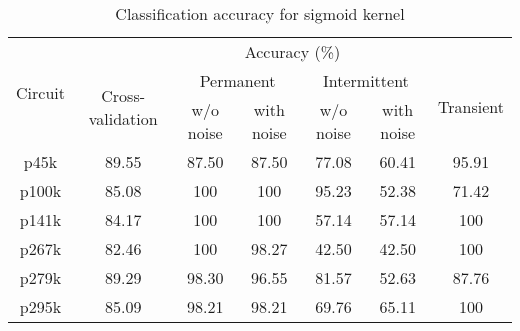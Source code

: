 \begin{table}[h]

	\captionsetup{justification=centering}
\begin{tabular}{ccccccc}
\hline
\multirow{3}{*}{Circuit} & \multicolumn{6}{c}{Accuracy (\%)}                                                                                                 \\ \cline{2-7} 
                         & \multirow{2}{*}{Cross-validation} & \multicolumn{2}{c}{Permanent} & \multicolumn{2}{c}{Intermittent} & \multirow{2}{*}{Transient} \\ \cline{3-6}
                         &                                   & w/o noise     & with noise    & w/o noise      & with noise      &                            \\ \hline
p45k                     & 89.55                             & 87.50         & 87.50         & 77.08          & 60.41           & 95.91                      \\
p100k                    & 85.08                             & 100           & 100           & 95.23          & 52.38           & 71.42                      \\
p141k                    & 84.17                             & 100           & 100           & 57.14          & 57.14           & 100                        \\
p267k                    & 82.46                             & 100           & 98.27         & 42.50          & 42.50           & 100                        \\
p279k                    & 89.29                             & 98.30         & 96.55         & 81.57          & 52.63           & 87.76                      \\
p295k                    & 85.09                             & 98.21         & 98.21         & 69.76          & 65.11           & 100                       \\
\hline                                                     
\end{tabular}
\caption {Classification accuracy for sigmoid kernel}
\label{tab:sigwp}
\end{table}



